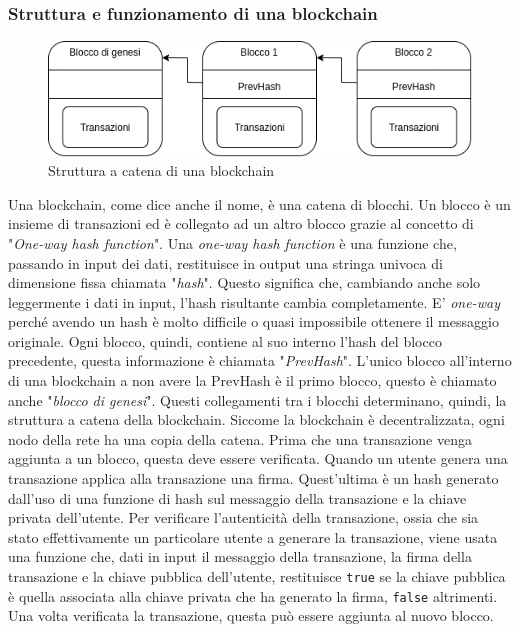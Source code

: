 \documentclass[a4paper]{article}
\begin{document}
    \subsubsection{Struttura e funzionamento di una blockchain}
    \label{blockchainFunc}
    \begin{figure}[ht]
      \includegraphics[scale=0.7, fbox]{blockchain.drawio.png}
      \centering
      \caption{Struttura a catena di una blockchain}
      \centering
      \label{fig:blockchainStruct}
    \end{figure}
    Una blockchain, come dice anche il nome, è una catena di blocchi. Un blocco è un insieme di transazioni ed è collegato ad un altro blocco grazie al concetto di "\emph{One-way hash function}".
    Una \emph{one-way hash function} è una funzione che, passando in input dei dati, restituisce in output una stringa univoca di dimensione fissa chiamata "\emph{hash}". Questo significa che, cambiando anche
    solo leggermente i dati in input, l'hash risultante cambia completamente. E' \emph{one-way} perché avendo un hash è molto difficile o quasi impossibile ottenere il messaggio originale.
    Ogni blocco, quindi, contiene al suo interno l'hash del blocco precedente, questa informazione è chiamata "\emph{PrevHash}". L'unico blocco all'interno di una blockchain a non avere la PrevHash è il primo blocco,
    questo è chiamato anche "\emph{blocco di genesi}". Questi collegamenti tra i blocchi determinano, quindi, la struttura a catena della blockchain. Siccome la blockchain è decentralizzata, ogni nodo della rete ha una copia
    della catena. Prima che una transazione venga aggiunta a un blocco, questa deve essere verificata. Quando un utente genera una transazione applica alla transazione una firma. Quest'ultima è un hash generato dall'uso di una funzione di hash sul messaggio della transazione e la chiave privata dell'utente.
    Per verificare l'autenticità della transazione, ossia che sia stato effettivamente un particolare utente a generare la transazione, viene usata una funzione che, dati in input il messaggio della transazione, la firma della transazione e la chiave pubblica dell'utente, restituisce \verb|true| se la chiave pubblica
    è quella associata alla chiave privata che ha generato la firma, \verb|false| altrimenti. Una volta verificata la transazione, questa può essere aggiunta al nuovo blocco.
\end{document}
